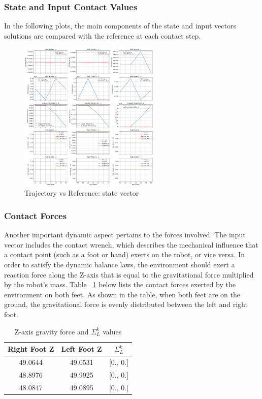 \documentclass[main.tex]{subfiles}
\begin{document}
\subsubsection*{State and Input Contact Values}
In the following plots, the main components of the state and input vectors solutions are compared with the reference at each contact step.
\begin{figure}[H]
    \centering
    \includegraphics[width=0.6\textwidth]{figures/contact_x_still.png}
    \caption{Trajectory vs Reference: state vector}
    \label{fig:contact_x_still}
\end{figure}

\subsubsection*{Contact Forces}
Another important dynamic aspect pertains to the forces involved. The input vector includes the contact wrench, which describes the mechanical influence that a contact point (such as a foot or hand) exerts on the robot, or vice versa.
In order to satisfy the dynamic balance laws, the environment should exert a reaction force along the Z-axis that is equal to the gravitational force multiplied by the robot's mass. Table ~\ref{tab:contactforcesstill} below lists the contact forces exerted by the environment on both feet. As shown in the table, when both feet are on the ground, the gravitational force is evenly distributed between the left and right foot.
\begin{table}[H]
\centering
\begin{tabular}{ccc}
\toprule
Right Foot Z & Left Foot Z & $\Sigma_L^k$ \\
\midrule
49.0644 & 49.0531 & [0., 0.] \\
48.8976 & 49.9925 & [0., 0.] \\
48.0847 & 49.0895 & [0., 0.] \\
\bottomrule
\end{tabular}
\caption{Z-axis gravity force and $\Sigma_L^k$ values}
\label{tab:contactforcesstill}

\end{table}
\end{document}
